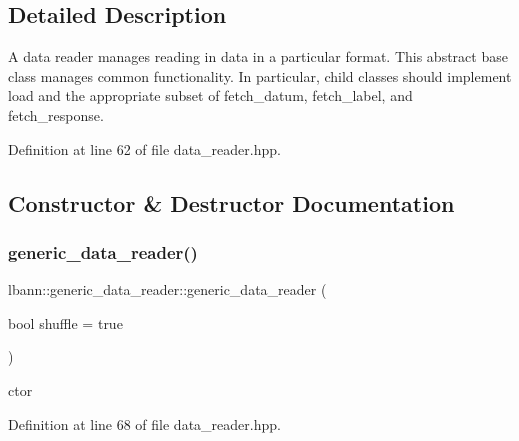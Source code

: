 \subsection{Detailed Description}
A data reader manages reading in data in a particular format. This abstract base class manages common functionality. In particular, child classes should implement load and the appropriate subset of fetch\+\_\+datum, fetch\+\_\+label, and fetch\+\_\+response. 

Definition at line 62 of file data\+\_\+reader.\+hpp.



\subsection{Constructor \& Destructor Documentation}
\mbox{\label{classlbann_1_1generic__data__reader_aaba933b8f7c1227801f6e80d39986af4}} 
\subsubsection{\texorpdfstring{generic\+\_\+data\+\_\+reader()}{generic\_data\_reader()}\hspace{0.1cm}{\footnotesize\ttfamily [1/2]}}
{\footnotesize\ttfamily lbann\+::generic\+\_\+data\+\_\+reader\+::generic\+\_\+data\+\_\+reader (\begin{DoxyParamCaption}\item[{bool}]{shuffle = {\ttfamily true} }\end{DoxyParamCaption})\hspace{0.3cm}{\ttfamily [inline]}}

ctor 

Definition at line 68 of file data\+\_\+reader.\+hpp.


